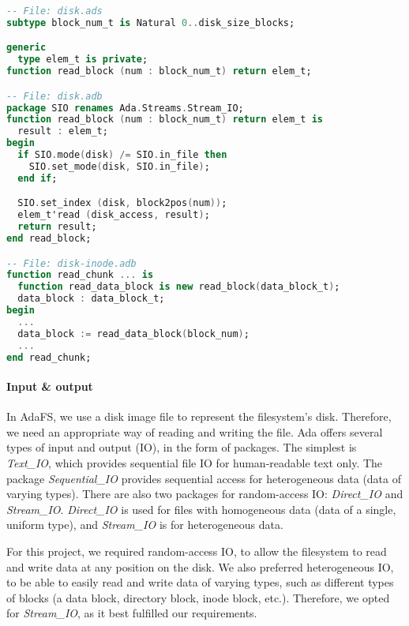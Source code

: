 \begin{lstlisting}[float=tb,caption={Generic function for reading a block of type \textnormal{elem\_t}.}, label={code:generic reading function}, language=Ada]
-- File: disk.ads
subtype block_num_t is Natural 0..disk_size_blocks;

generic
  type elem_t is private;
function read_block (num : block_num_t) return elem_t;

-- File: disk.adb
package SIO renames Ada.Streams.Stream_IO;
function read_block (num : block_num_t) return elem_t is
  result : elem_t;
begin
  if SIO.mode(disk) /= SIO.in_file then
    SIO.set_mode(disk, SIO.in_file);
  end if;

  SIO.set_index (disk, block2pos(num));
  elem_t'read (disk_access, result);
  return result;
end read_block;

-- File: disk-inode.adb
function read_chunk ... is
  function read_data_block is new read_block(data_block_t);
  data_block : data_block_t;
begin
  ...
  data_block := read_data_block(block_num);
  ...
end read_chunk;
\end{lstlisting}

\paragraph{Input \& output}
In AdaFS, we use a disk image file to represent the filesystem's disk.
Therefore, we need an appropriate way of reading and writing the file.
Ada offers several types of input and output (IO), in the form of packages.
The simplest is \textit{Text\_IO}, which provides sequential file IO for human-readable text only.
The package \textit{Sequential\_IO} provides sequential access for heterogeneous data (data of varying types).
There are also two packages for random-access IO: \textit{Direct\_IO} and \textit{Stream\_IO}.
\textit{Direct\_IO} is used for files with homogeneous data (data of a single, uniform type), and \textit{Stream\_IO} is for heterogeneous data.

For this project, we required random-access IO, to allow the filesystem to read and write data at any position on the disk.
We also preferred heterogeneous IO, to be able to easily read and write data of varying types, such as different types of blocks (a data block, directory block, inode block, etc.).
Therefore, we opted for \textit{Stream\_IO}, as it best fulfilled our requirements.


